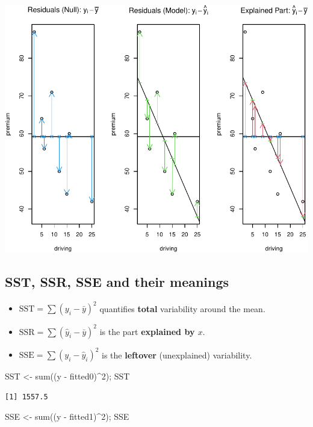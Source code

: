 \documentclass[
  letterpaper,
]{scrbook}
\newenvironment{Shaded}{\begin{snugshade}}{\end{snugshade}}
\newcommand{\DecValTok}[1]{\textcolor[rgb]{0.68,0.00,0.00}{#1}}
\newcommand{\FunctionTok}[1]{\textcolor[rgb]{0.28,0.35,0.67}{#1}}
\newcommand{\NormalTok}[1]{\textcolor[rgb]{0.00,0.23,0.31}{#1}}
\newcommand{\OtherTok}[1]{\textcolor[rgb]{0.00,0.23,0.31}{#1}}
\newcommand{\SpecialCharTok}[1]{\textcolor[rgb]{0.37,0.37,0.37}{#1}}
\providecommand{\tightlist}{%
  \setlength{\itemsep}{0pt}\setlength{\parskip}{0pt}}\usepackage{longtable,booktabs,array}
\begin{document}
\includegraphics{unit2-slr/slr_files/figure-pdf/unnamed-chunk-7-1.pdf}

\subsection{SST, SSR, SSE and their
meanings}\label{sst-ssr-sse-and-their-meanings}

\begin{itemize}
\tightlist
\item
  \(\text{SST}=\sum (y_i-\bar y)^2\) quantifies \textbf{total}
  variability around the mean.
\item
  \(\text{SSR}=\sum (\hat y_i-\bar y)^2\) is the part \textbf{explained
  by \(x\)}.
\item
  \(\text{SSE}=\sum (y_i-\hat y_i)^2\) is the \textbf{leftover}
  (unexplained) variability.
\end{itemize}

\begin{Shaded}
\begin{Highlighting}[]
\NormalTok{SST }\OtherTok{\textless{}{-}} \FunctionTok{sum}\NormalTok{((y }\SpecialCharTok{{-}}\NormalTok{ fitted0)}\SpecialCharTok{\^{}}\DecValTok{2}\NormalTok{); SST}
\end{Highlighting}
\end{Shaded}

\begin{verbatim}
[1] 1557.5
\end{verbatim}

\begin{Shaded}
\begin{Highlighting}[]
\NormalTok{SSE }\OtherTok{\textless{}{-}} \FunctionTok{sum}\NormalTok{((y }\SpecialCharTok{{-}}\NormalTok{ fitted1)}\SpecialCharTok{\^{}}\DecValTok{2}\NormalTok{); SSE}
\end{Highlighting}
\end{Shaded}
\end{document}
